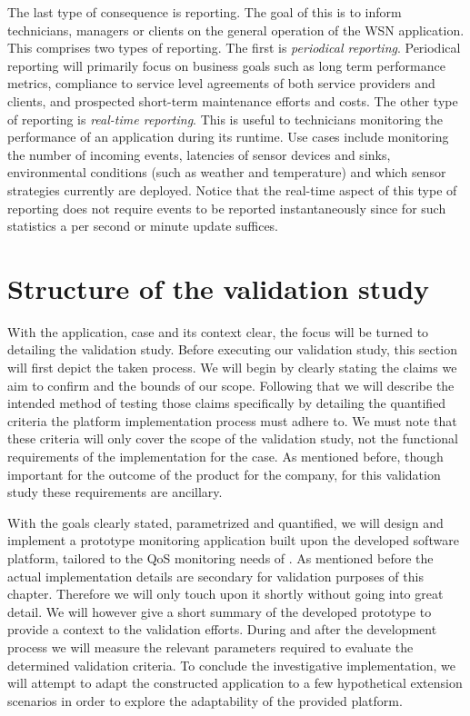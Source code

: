 The last type of consequence is reporting. The goal of this is to inform technicians, managers or clients on the general operation of the WSN application. This comprises two types of reporting. The first is \emph{periodical reporting}. Periodical reporting will primarily focus on business goals such as long term performance metrics, compliance to service level agreements of both service providers and clients, and prospected short-term maintenance efforts and costs. The other type of reporting is \emph{real-time reporting}. This is useful to technicians monitoring the performance of an application during its runtime. Use cases include monitoring the number of incoming events, latencies of sensor devices and sinks, environmental conditions (such as weather and temperature) and which sensor strategies currently are deployed. Notice that the real-time aspect of this type of reporting does not require events to be reported instantaneously since for such statistics a per second or minute update suffices.

\section{Structure of the validation study}
With the application, case and its context clear, the focus will be turned to detailing the validation study. Before executing our validation study, this section will first depict the taken process. We will begin by clearly stating the claims we aim to confirm and the bounds of our scope. Following that we will describe the intended method of testing those claims specifically by detailing the quantified criteria the platform implementation process must adhere to. We must note that these criteria will only cover the scope of the validation study, not the functional requirements of the implementation for the case. As mentioned before, though important for the outcome of the product for the company, for this validation study these requirements are ancillary.

With the goals clearly stated, parametrized and quantified, we will design and implement a prototype monitoring application built upon the developed software platform, tailored to the QoS monitoring needs of \idsystems. As mentioned before the actual implementation details are secondary for validation purposes of this chapter. Therefore we will only touch upon it shortly without going into great detail. We will however give a short summary of the developed prototype to provide a context to the validation efforts. During and after the development process we will measure the relevant parameters required to evaluate the determined validation criteria. To conclude the investigative implementation, we will attempt to adapt the constructed application to a few hypothetical extension scenarios in order to explore the adaptability of the provided platform.

